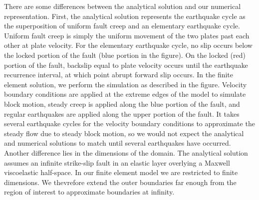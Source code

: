 There are some differences between the analytical solution and our
numerical representation. First, the analytical solution represents
the earthquake cycle as the superposition of uniform fault creep and
an elementary earthquake cycle. Uniform fault creep is simply the
uniform movement of the two plates past each other at plate velocity.
For the elementary earthquake cycle, no slip occurs below the locked
portion of the fault (blue portion in the figure). On the locked (red)
portion of the fault, backslip equal to plate velocity occurs until
the earthquake recurrence interval, at which point abrupt forward
slip occurs. In the finite element solution, we perform the simulation
as described in the figure. Velocity boundary conditions are applied
at the extreme edges of the model to simulate block motion, steady
creep is applied along the blue portion of the fault, and regular
earthquakes are applied along the upper portion of the fault. It takes
several earthquake cycles for the velocity boundary conditions to
approximate the steady flow due to steady block motion, so we would
not expect the analytical and numerical solutions to match until several
earthquakes have occurred. Another difference lies in the dimensions
of the domain. The analytical solution assumes an infinite strike-slip
fault in an elastic layer overlying a Maxwell viscoelastic half-space.
In our finite element model we are restricted to finite dimensions.
We thevrefore extend the outer boundaries far enough from the region
of interest to approximate boundaries at infinity.

